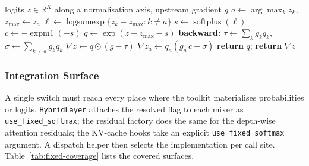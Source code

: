 \begin{algorithm}[H]
\caption{Fixed softmax (forward + vector--Jacobian product)}
\begin{algorithmic}[1]
\Require logits $z \in \mathbb{R}^{K}$ along a normalisation axis, upstream gradient $g$
\State $a \gets \arg\max_k z_k$, \quad $z_{\max} \gets z_a$
\State $\ell \gets \operatorname{logsumexp}\{z_k - z_{\max} : k \neq a\}$ 
\State $s \gets \operatorname{softplus}(\ell)$ 
\State $c \gets -\operatorname{expm1}(-s)$ 
\State $q \gets \exp(z - z_{\max} - s)$ 
\State \textbf{backward:}
\State $\tau \gets \sum_k g_k q_k$, \quad $\sigma \gets \sum_{k \neq a} g_k q_k$
\State $\nabla z \gets q \odot (g - \tau)$
\State $\nabla z_a \gets q_a\left(g_a\,c - \sigma\right)$ 
\State \textbf{return} $q$; \quad \textbf{return} $\nabla z$
\end{algorithmic}
\end{algorithm}

\subsubsection{Integration Surface}

A single switch must reach every place where the toolkit materialises probabilities or logits. \texttt{HybridLayer} attaches the resolved flag to each mixer as \texttt{use\_fixed\_softmax}; the residual factory does the same for the depth-wise attention residuals; the KV-cache hooks take an explicit \texttt{use\_fixed\_softmax} argument. A dispatch helper then selects the implementation per call site. Table~\ref{tab:fixed-coverage} lists the covered surfaces.

